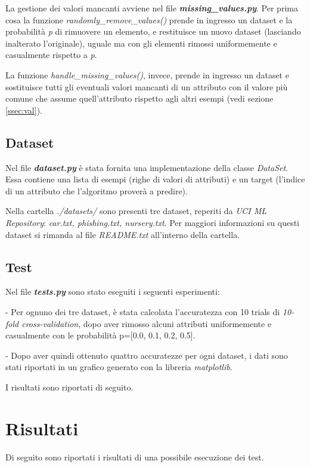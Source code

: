 \documentclass[a4paper,12pt]{article}
\begin{document}
La gestione dei valori mancanti avviene nel file \textit{\textbf{missing\_values.py}}. Per prima cosa la funzione \textit{randomly\_remove\_values()} prende in ingresso un dataset e la probabilità \textit{p} di rimuovere un elemento, e restituisce un nuovo dataset (lasciando inalterato l'originale), uguale ma con gli elementi rimossi uniformemente e casualmente rispetto a \textit{p}.


La funzione \textit{handle\_missing\_values()}, invece, prende in ingresso un dataset e sostituisce tutti gli eventuali valori mancanti di un attributo con il valore più comune che assume quell'attributo rispetto agli altri esempi (vedi sezione \ref{ssec:val}).

\subsection{Dataset}
Nel file \textit{\textbf{dataset.py}} è stata fornita una implementazione della classe \textit{DataSet}. Essa contiene una lista di esempi (righe di valori di attributi) e un target (l'indice di un attributo che l'algoritmo proverà a predire).
\newline

Nella cartella \textit{./datasets/} sono presenti tre dataset, reperiti da \textit{UCI ML Repository}: \textit{car.txt, phishing.txt, nursery.txt}. Per maggiori informazioni su questi dataset si rimanda al file \textit{README.txt} all'interno della cartella.

\subsection{Test}
Nel file \textit{\textbf{tests.py}} sono stato eseguiti i seguenti esperimenti:
\newline

- Per ognuno dei tre dataset, è stata calcolata l'accuratezza con 10 trials di \textit{10-fold cross-validation}, dopo aver rimosso alcuni attributi uniformemente e casualmente con le probabilità p=[0.0, 0.1, 0.2, 0.5].
\newline

- Dopo aver quindi ottenuto quattro accuratezze per ogni dataset, i dati sono stati riportati in un grafico generato con la libreria \textit{matplotlib}.
\newline

I risultati sono riportati di seguito.

\clearpage
\section{Risultati} \label{ssec:ris}
Di seguito sono riportati i risultati di una possibile esecuzione dei test.
\end{document}
